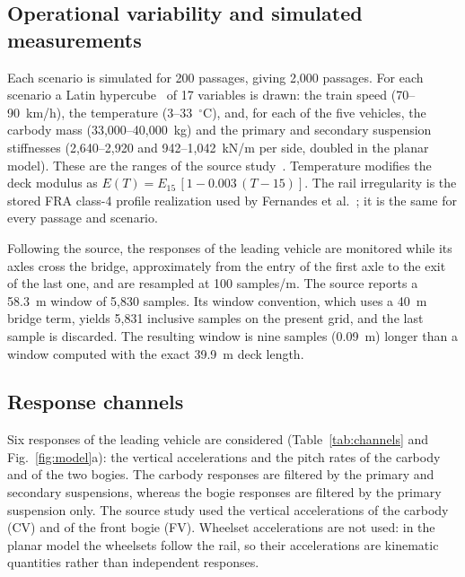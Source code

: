 \subsection{Operational variability and simulated measurements}
\label{sec:eov}

Each scenario is simulated for 200 passages, giving 2,000 passages. For each
scenario a Latin hypercube~\cite{mckay1979comparison} of 17 variables is drawn:
the train speed (70--90~km/h), the temperature (3--33~$^{\circ}$C), and, for each
of the five vehicles, the carbody mass (33,000--40,000~kg) and the primary and
secondary suspension stiffnesses (2,640--2,920 and 942--1,042~kN/m per side,
doubled in the planar model). These are the ranges of the source
study~\cite{fernandes2025early}. Temperature modifies the deck modulus as
$E(T)=E_{15}\,[1-0.003\,(T-15)]$. The rail irregularity is the stored FRA
class-4 profile realization used by Fernandes et
al.~\cite{fernandes2024driveby, fernandes2025early}; it is the same for every
passage and scenario.

Following the source, the responses of the leading vehicle are monitored while
its axles cross the bridge, approximately from the entry of the first axle to
the exit of the last one, and are resampled at 100 samples/m. The source reports
a 58.3~m window of 5,830 samples. Its window convention, which uses a 40~m
bridge term, yields 5,831 inclusive samples on the present grid, and the last
sample is discarded. The resulting window is nine samples (0.09~m) longer than
a window computed with the exact 39.9~m deck length.

\subsection{Response channels}
\label{sec:response_channels}

Six responses of the leading vehicle are considered (Table~\ref{tab:channels}
and Fig.~\ref{fig:model}a): the vertical accelerations and the pitch rates of
the carbody and of the two bogies. The carbody responses are filtered by the
primary and secondary suspensions, whereas the bogie responses are filtered by
the primary suspension only. The source study used the vertical accelerations
of the carbody (CV) and of the front bogie (FV). Wheelset accelerations are not
used: in the planar model the wheelsets follow the rail, so their accelerations
are kinematic quantities rather than independent responses.

